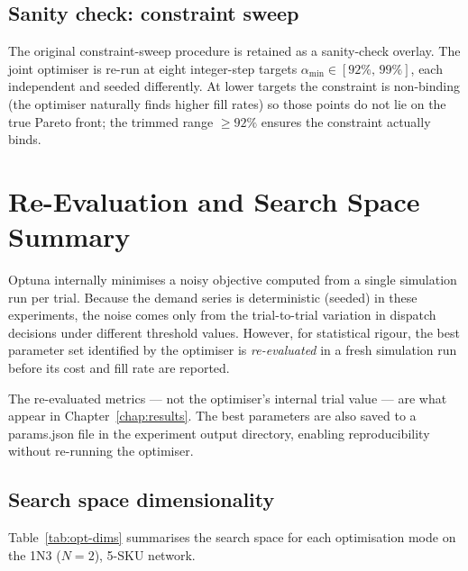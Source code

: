 \subsection{Sanity check: constraint sweep}

The original constraint-sweep procedure is retained as a sanity-check
overlay.  The joint optimiser is re-run at
eight integer-step targets $\alpha_{\min} \in [92\%,\,99\%]$,
each independent and seeded differently.  At lower targets the
constraint is non-binding (the optimiser naturally finds higher fill
rates) so those points do not lie on the true Pareto front; the trimmed
range $\geq 92\%$ ensures the constraint actually binds.


\section{Re-Evaluation and Search Space Summary}
\label{sec:opt:reeval}

Optuna internally minimises a noisy objective computed from a single
simulation run per trial.  Because the demand series is deterministic
(seeded) in these experiments, the noise comes only from the trial-to-trial
variation in dispatch decisions under different threshold values.  However,
for statistical rigour, the best parameter set identified by the optimiser
is \emph{re-evaluated} in a fresh simulation run before its cost and fill
rate are reported.

The re-evaluated metrics — not the optimiser's internal trial value —
are what appear in Chapter~\ref{chap:results}.  The best parameters are
also saved to a params.json file in the experiment output
directory, enabling reproducibility without re-running the optimiser.

\subsection{Search space dimensionality}
\label{sec:opt:dims}

Table~\ref{tab:opt-dims} summarises the search space for each optimisation
mode on the 1N3 ($N=2$), 5-SKU network.


